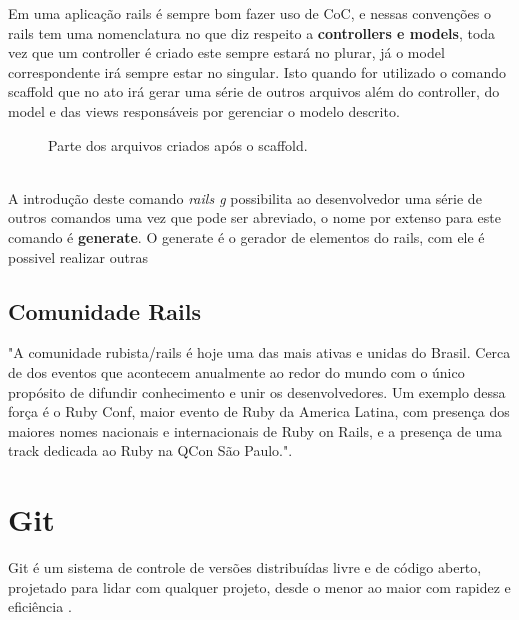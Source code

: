 Em uma aplicação rails é sempre bom fazer uso de CoC, e nessas convenções o rails tem uma nomenclatura no que diz respeito a \textbf{controllers e models}, toda vez que um controller é criado
este sempre estará no plurar, já o model correspondente irá sempre estar no singular. Isto quando for utilizado o comando scaffold que no ato irá gerar uma série de outros arquivos além do controller, 
do model e das views responsáveis por gerenciar o modelo descrito.
\\
\begin{figure}[ht]
    \centering
    \caption{Parte dos arquivos criados após o scaffold.}
    \label{submeter}
\end{figure}
\\
A introdução deste comando \textit{rails g} possibilita ao desenvolvedor uma série de outros comandos
uma vez que pode ser abreviado, o nome por extenso para este comando é \textbf{generate}. O generate é o gerador de elementos do rails, com ele é possivel realizar outras 

\subsection{Comunidade Rails}

"A comunidade rubista/rails é hoje uma das mais ativas e unidas do Brasil. Cerca de dos eventos que acontecem anualmente
ao redor do mundo com o único propósito de difundir conhecimento e unir os desenvolvedores. Um exemplo dessa força é o Ruby Conf, maior evento 
de Ruby da America Latina, com presença dos maiores nomes nacionais e internacionais de Ruby on Rails, e a presença de uma track dedicada ao 
Ruby na QCon São Paulo."\cite{CAELUM}.

\section{Git}
Git é um sistema de controle de versões distribuídas livre e de código aberto, projetado para lidar com qualquer projeto, desde o menor ao maior com rapidez e eficiência \cite{SOFTWARE-FREEDOM-CONSERVANCY}.

